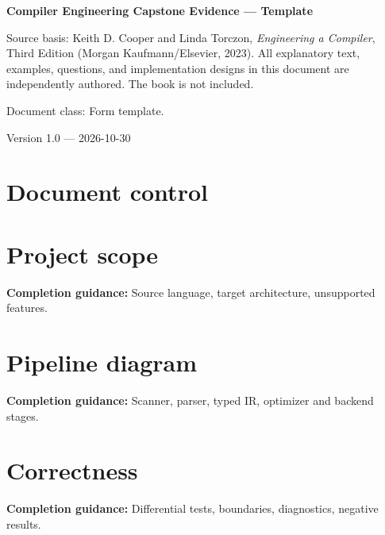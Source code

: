 \documentclass[10pt,letterpaper]{article}
\begin{document}
\hypersetup{pageanchor=false}%
\begin{titlepage}
\centering\vspace*{1.0in}
{\Huge\bfseries\textcolor{CompilerBlue}{Compiler Engineering Capstone Evidence --- Template}\par}
\vspace{.22in}{\Large Authoring form and printable record\par}
\vspace{.4in}{\large Compiler Engineering Documentation Suite\par}
\vfill
\begin{minipage}{.86\linewidth}\small
Source basis: Keith D. Cooper and Linda Torczon, \emph{Engineering a Compiler}, Third Edition (Morgan Kaufmann/Elsevier, 2023). All explanatory text, examples, questions, and implementation designs in this document are independently authored. The book is not included.\par\medskip
Document class: Form template.
\end{minipage}
\vfill\textcolor{CompilerGray}{Version 1.0 --- 2026-10-30}\par
\end{titlepage}\hypersetup{pageanchor=true}
\tableofcontents\clearpage
\section{Document control}
\section{Project scope}
\textbf{Completion guidance:} Source language, target architecture, unsupported features.\par\medskip{}
\section{Pipeline diagram}
\textbf{Completion guidance:} Scanner, parser, typed IR, optimizer and backend stages.\par\medskip{}
\section{Correctness}
\textbf{Completion guidance:} Differential tests, boundaries, diagnostics, negative results.\par\medskip{}
\end{document}
